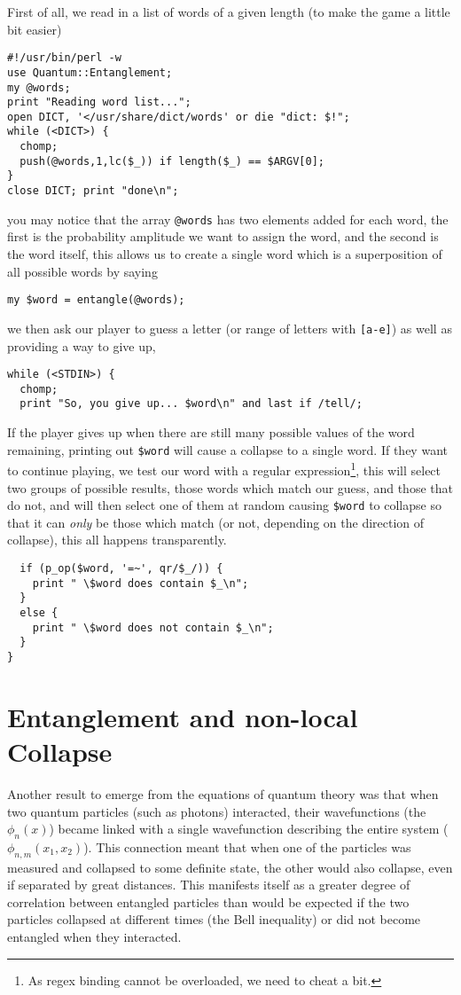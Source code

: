 \documentclass{article}      %
\newcommand{\pvar}[1]{\texttt{\$#1}} %
\newcommand{\ptt}[1]{\texttt{#1}}    %
\begin{document}
First of all, we read in a list of words of a given length (to make
the game a little bit easier)
\begin{verbatim}
#!/usr/bin/perl -w
use Quantum::Entanglement;
my @words;
print "Reading word list...";
open DICT, '</usr/share/dict/words' or die "dict: $!";
while (<DICT>) {
  chomp;
  push(@words,1,lc($_)) if length($_) == $ARGV[0];
}
close DICT; print "done\n";
\end{verbatim}
you may notice that the array \ptt{@words} has two elements added for
each word, the first is the probability amplitude we want to assign
the word, and the second is the word itself, this allows us to create
a single word which is a superposition of all possible words by saying
\begin{verbatim}
my $word = entangle(@words);
\end{verbatim} %
we then ask our player to guess a letter (or range of letters
with \ptt{[a-e]}) as well as providing a way to give up,
\begin{verbatim}
while (<STDIN>) {
  chomp;
  print "So, you give up... $word\n" and last if /tell/;
\end{verbatim} %
If the player gives up when there are still many possible values of
the word remaining, printing out \pvar{word} will cause a collapse to
a single word.
If they want to continue playing, we test our word with a regular
expression\footnote{As regex
binding cannot be overloaded, we need to cheat a bit.}, this will
select two groups of possible results, those words which match our
guess, and those that do not, and will then select one of them at
random causing \pvar{word} to collapse so that it can \emph{only} be
those which match (or not, depending on the direction of collapse),
this all happens transparently.
\begin{verbatim}
  if (p_op($word, '=~', qr/$_/)) {
    print " \$word does contain $_\n";
  }
  else {
    print " \$word does not contain $_\n";
  }
}
\end{verbatim} %

\section{Entanglement and non-local Collapse}

Another result to emerge from the equations of quantum theory was that
when two quantum particles (such as photons) interacted, their
wavefunctions (the $\phi_n(x)$) became linked with a single
wavefunction describing the entire system ($\phi_{n,m}(x_1,x_2)$).
This connection meant
that when one of the particles was measured and collapsed to some
definite state, the other would also collapse, even if separated by great
distances.  This manifests itself as a greater degree of correlation
between entangled particles than would be expected if the two
particles collapsed at different times (the Bell inequality) or did
not become entangled when they interacted.
\end{document}
